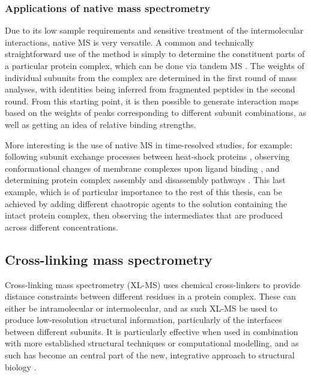 \documentclass[a4paper,11pt,twoside,openright]{scrbook}
\begin{document}
\subsubsection{Applications of native mass spectrometry}
Due to its low sample requirements and sensitive treatment of the intermolecular interactions, native MS is very versatile. A common and technically straightforward use of the method is simply to determine the constituent parts of a particular protein complex, which can be done via tandem MS \cite{Sobott2002,Hernandez2007}. The weights of individual subunits from the complex are determined in the first round of mass analyses, with identities being inferred from fragmented peptides in the second round. From this starting point, it is then possible to generate interaction maps based on the weights of peaks corresponding to different subunit combinations, as well as getting an idea of relative binding strengths.

More interesting is the use of native MS in time-resolved studies, for example: following subunit exchange processes between heat-shock proteins \cite{Sobott2002a}, observing conformational changes of membrane complexes upon ligand binding \cite{Laganowsky2014}, and determining protein complex assembly and disassembly pathways \cite{Levy2008}. This last example, which is of particular importance to the rest of this thesis, can be achieved by adding different chaotropic agents to the solution containing the intact protein complex, then observing the intermediates that are produced across different concentrations.

\subsection{Cross-linking mass spectrometry}
Cross-linking mass spectrometry (XL-MS) uses chemical cross-linkers to provide distance constraints between different residues in a protein complex. These can either be intramolecular or intermolecular, and as such XL-MS be used to produce low-resolution structural information, particularly of the interfaces between different subunits. It is particularly effective when used in combination with more established structural techniques or computational modelling, and as such has become an central part of the new, integrative approach to structural biology \cite{Stengel2012,Ward2013,VandenBedem2015}.
\end{document}
